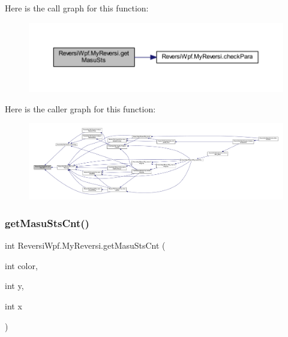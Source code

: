 Here is the call graph for this function\+:\nopagebreak
\begin{figure}[H]
\begin{center}
\leavevmode
\includegraphics[width=350pt]{class_reversi_wpf_1_1_my_reversi_a34b0c0b96b147a8d2f1dc6863cac25d8_cgraph}
\end{center}
\end{figure}
Here is the caller graph for this function\+:
\nopagebreak
\begin{figure}[H]
\begin{center}
\leavevmode
\includegraphics[width=350pt]{class_reversi_wpf_1_1_my_reversi_a34b0c0b96b147a8d2f1dc6863cac25d8_icgraph}
\end{center}
\end{figure}
\mbox{\label{class_reversi_wpf_1_1_my_reversi_ac2723c418d4b51ec0e4598cbd44634f0}} 
\subsubsection{\texorpdfstring{get\+Masu\+Sts\+Cnt()}{getMasuStsCnt()}}
{\footnotesize\ttfamily int Reversi\+Wpf.\+My\+Reversi.\+get\+Masu\+Sts\+Cnt (\begin{DoxyParamCaption}\item[{int}]{color,  }\item[{int}]{y,  }\item[{int}]{x }\end{DoxyParamCaption})}



